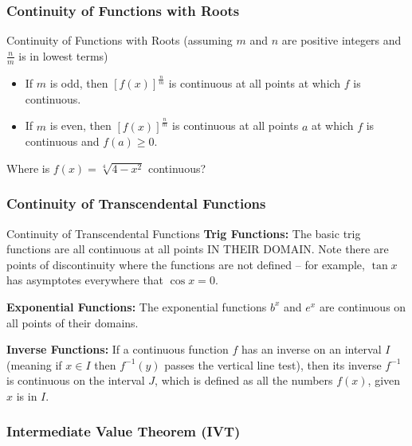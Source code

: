 \documentclass[Cal1Spr16Lectures.tex]{subfiles}
\begin{document}
\subsubsection{Continuity of Functions with Roots}

\begin{frame}{\small Continuity of Functions with Roots}{}
{\small (assuming $m$ and $n$ are positive integers and $\textstyle\frac{n}{m}$ is in lowest terms)}
\begin{itemize}
\item If $m$ is odd, then $[f(x)]^{\frac{n}{m}}$ is continuous at all points at which $f$ is continuous.
\item If $m$ is even, then $[f(x)]^{\frac{n}{m}}$ is continuous at all points $a$ at which $f$ is continuous \alert{and $f(a)\geq 0$}.
\end{itemize}
\begin{que}  Where is $f(x)=\sqrt[4]{4-x^2}$ continuous?\end{que}
\end{frame}

\subsubsection{Continuity of Transcendental Functions}

\begin{frame}{\small Continuity of Transcendental Functions}
\footnotesize
{\bf Trig Functions:} The basic trig functions are all continuous at all points \alert{IN THEIR DOMAIN}.  Note there are points of discontinuity where the functions are not defined -- for example, $\tan x$ has asymptotes everywhere that $\cos x=0$.  

\vspace{1pc}
{\bf Exponential Functions:}  The exponential functions $b^x$ and $e^x$ are continuous on all points of their domains.

\vspace{1pc}
{\bf Inverse Functions:}  If a continuous function $f$ has an inverse on an interval $I$ (meaning if $x\in I$ then $f^{-1}(y)$ passes the vertical line test), then its inverse $f^{-1}$ is continuous on the interval $J$, which is defined as all the numbers $f(x)$, given $x$ is in $I$.
\end{frame}

\subsubsection{Intermediate Value Theorem (IVT)}
\end{document}
